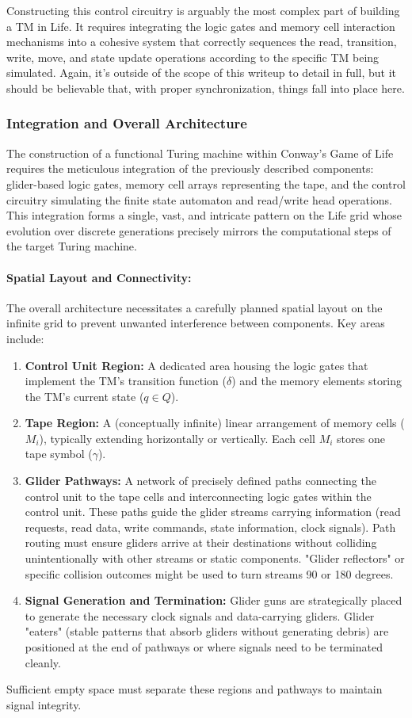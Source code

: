 \documentclass{article}
\theoremstyle{definition}
\theoremstyle{plain}
\theoremstyle{plain}
\begin{document}
Constructing this control circuitry is arguably the most complex part of building a TM in Life. It requires integrating the logic gates and memory cell interaction mechanisms into a cohesive system that correctly sequences the read, transition, write, move, and state update operations according to the specific TM being simulated. Again, it's outside of the scope of this writeup to detail in full, but it should be believable that, with proper synchronization, things fall into place here.


\subsubsection{Integration and Overall Architecture}

The construction of a functional Turing machine within Conway's Game of Life requires the meticulous integration of the previously described components: glider-based logic gates, memory cell arrays representing the tape, and the control circuitry simulating the finite state automaton and read/write head operations. This integration forms a single, vast, and intricate pattern on the Life grid whose evolution over discrete generations precisely mirrors the computational steps of the target Turing machine.

\paragraph{Spatial Layout and Connectivity:}
The overall architecture necessitates a carefully planned spatial layout on the infinite grid to prevent unwanted interference between components. Key areas include:
\begin{enumerate}
  \item \textbf{Control Unit Region:} A dedicated area housing the logic gates that implement the TM's transition function ($\delta$) and the memory elements storing the TM's current state ($q \in Q$).
  \item \textbf{Tape Region:} A (conceptually infinite) linear arrangement of memory cells ($M_i$), typically extending horizontally or vertically. Each cell $M_i$ stores one tape symbol ($\gamma$).
  \item \textbf{Glider Pathways:} A network of precisely defined paths connecting the control unit to the tape cells and interconnecting logic gates within the control unit. These paths guide the glider streams carrying information (read requests, read data, write commands, state information, clock signals). Path routing must ensure gliders arrive at their destinations without colliding unintentionally with other streams or static components. "Glider reflectors" or specific collision outcomes might be used to turn streams 90 or 180 degrees.
  \item \textbf{Signal Generation and Termination:} Glider guns are strategically placed to generate the necessary clock signals and data-carrying gliders. Glider "eaters" (stable patterns that absorb gliders without generating debris) are positioned at the end of pathways or where signals need to be terminated cleanly.
\end{enumerate}
Sufficient empty space must separate these regions and pathways to maintain signal integrity.
\end{document}
